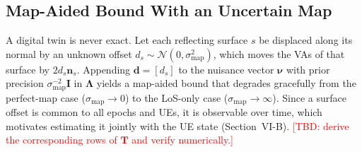 \documentclass[journal]{IEEEtran}
\newcommand{\tbd}[1]{\textcolor{red}{[TBD: #1]}}
\newenvironment{proposed}{\color{propcol}}{}
\begin{document}
\begin{proposed}
\subsection{Map-Aided Bound With an Uncertain Map}
A digital twin is never exact. Let each reflecting surface $s$ be
displaced along its normal by an unknown offset
$d_s\sim\mathcal N(0,\sigma_{\mathrm{map}}^2)$, which moves the VAs of
that surface by $2d_s\mathbf n_s$. Appending $\mathbf d=[d_s]$ to the
nuisance vector $\boldsymbol\nu$ with prior precision
$\sigma_{\mathrm{map}}^{-2}\mathbf I$ in $\boldsymbol\Lambda$ yields a
map-aided bound that degrades gracefully from the perfect-map case
($\sigma_{\mathrm{map}}\to0$) to the LoS-only case
($\sigma_{\mathrm{map}}\to\infty$). Since a surface offset is common to
all epochs and UEs, it is observable over time, which motivates
estimating it jointly with the UE state (Section~VI-B). \tbd{derive the
corresponding rows of $\mathbf T$ and verify numerically.}
\end{proposed}
\end{document}
